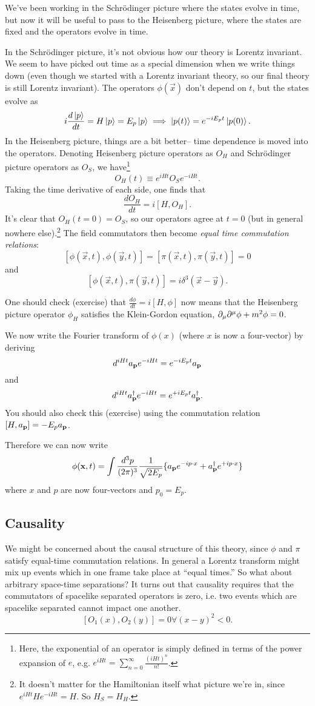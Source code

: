 We've been working in the Schr\"odinger picture where the states evolve in time, but now it will be useful to pass to the Heisenberg picture, where the states are fixed and the operators evolve in time.

In the Schr\"odinger picture, it's not obvious how our theory is Lorentz invariant. We seem to have picked out time as a special dimension when we write things down (even though we started with a Lorentz invariant theory, so our final theory is still Lorentz invariant). The operators $\phi(\vec x)$ don't depend on $t$, but the states evolve as
$$i \frac{d\left| p \right>}{dt}=H\left| p \right> = E_p\left| p \right> \implies \left| p(t) \right>= e^{-i E_pt} \left| p(0) \right>.$$
In the Heisenberg picture, things are a bit better-- time dependence is moved into the operators. Denoting Heisenberg picture operators as $O_H$ and Schr\"odinger picture operators as $O_S$, we have\footnote{Here, the exponential of an operator is simply defined in terms of the power expansion of $e$, e.g. $e^{iHt}=\sum_{n=0}^\infty \frac{(iHt)^n}{n!}$.}
$$O_H(t) \equiv e^{iHt}O_S e^{-iHt}.$$
Taking the time derivative of each side, one finds that
$$\frac{dO_H}{dt}=i[H,O_H].$$
It's clear that $O_H(t=0)=O_S$, so our operators agree at $t=0$ (but in general nowhere else).\footnote{It doesn't matter for the Hamiltonian itself what picture we're in, since $e^{iHt}H e^{-iHt}=H$. So $H_S=H_H$.} The field commutators then become \emph{equal time commutation relations}:
$$[\phi(\vec x,t),\phi(\vec y, t)]=[\pi(\vec x, t), \pi(\vec y,t)]=0$$
and
$$[\phi(\vec x, t), \pi (\vec y, t)]=i \delta^3(\vec x-\vec y).$$

\begin{ex}
One should check (exercise) that $\frac{d\phi}{dt}=i[H,\phi]$ now means that the Heisenberg picture operator $\phi_H$ satisfies the Klein-Gordon equation, $\partial_\mu \partial^\mu \phi+ m^2 \phi=0$.
\end{ex}
We now write the Fourier transform of $\phi(x)$ (where $x$ is now a four-vector) by deriving
$$d^{iHt}a_{\boldsymbol{\mathbf{p}}} e^{-iHt}=e^{-iE_p t} a_{\boldsymbol{\mathbf{p}}}$$
and
$$d^{iHt}a_{\boldsymbol{\mathbf{p}}}^\dagger e^{-iHt}=e^{+iE_p t} a_{\boldsymbol{\mathbf{p}}}^\dagger.$$
You should also check this (exercise) using the commutation relation $[H,a_{\boldsymbol{\mathbf{p}}}]=-E_p a_{\boldsymbol{\mathbf{p}}}$.

Therefore we can now write
$$\phi(\boldsymbol{\mathbf{x}}, t)=\int \frac{d^3p}{(2\pi)^3} \frac{1}{\sqrt{2E_p}} \{ a_{\boldsymbol{\mathbf{p}}} e^{-i p\cdot x}+a_{\boldsymbol{\mathbf{p}}}^\dagger e^{+i p\cdot x}\}$$
where $x$ and $p$ are now four-vectors and $p_0= E_p$.

\subsection*{Causality} We might be concerned about the causal structure of this theory, since $\phi$ and $\pi$ satisfy equal-time commutation relations. In general a Lorentz transform might mix up events which in one frame take place at ``equal times.'' So what about arbitrary space-time separations? It turns out that causality requires that the commutators of spacelike separated operators is zero, i.e. two events which are spacelike separated cannot impact one another.
$$[O_1(x),O_2(y)]=0 \forall (x-y)^2 <0.$$

